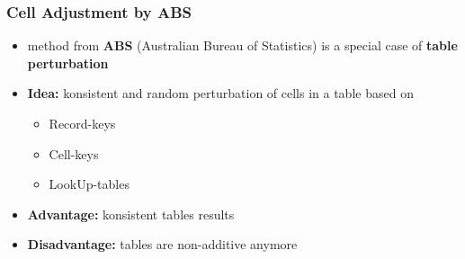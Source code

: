 \begin{frame}\frametitle{Cell Adjustment by ABS}
	\begin{itemize}
		\item method from {\bf ABS} (Australian Bureau of Statistics) is a special case of {\bf table perturbation} \pause
		\item {\bf Idea:} konsistent and random perturbation of cells in a table based on
		\begin{itemize}
		    \item Record-keys
		    \item Cell-keys
		    \item LookUp-tables \pause
		\end{itemize}
		\item {\bf Advantage:} konsistent tables results \pause
		\item {\bf Disadvantage:} tables are non-additive anymore \pause
	\end{itemize}
\end{frame}

